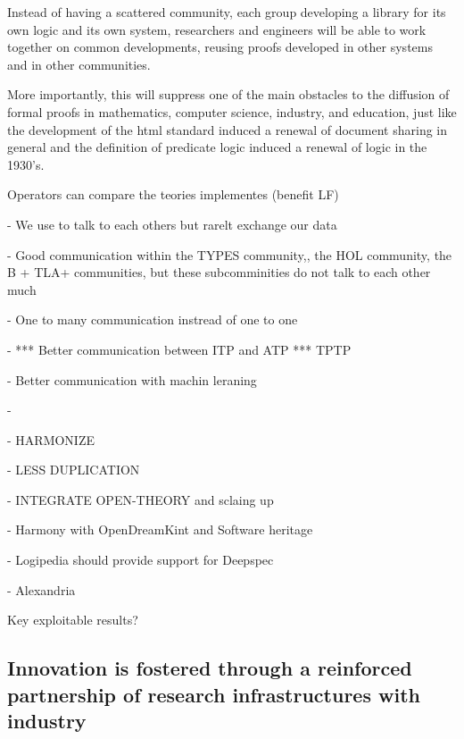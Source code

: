 Instead of having a scattered community, each group developing a
library for its own logic and its own system, researchers and
engineers will be able to work together on common developments,
reusing proofs developed in other systems and in other communities.

More importantly, this will suppress one of the main obstacles to the
diffusion of formal proofs in mathematics, computer science, industry,
and education, just like the development of the html standard induced
a renewal of document sharing in general and the definition of
predicate logic induced a renewal of logic in the 1930's.

Operators can compare the teories implementes (benefit LF)

- We use to talk to each others but rarelt exchange our data

- Good communication within the TYPES community,, the HOL community,
the B + TLA+ communities, but these subcomminities do not talk to each
other much

- One to many communication instread of one to one

- *** Better communication between ITP and ATP *** TPTP

- Better communication with machin leraning





- 

- HARMONIZE

- LESS DUPLICATION

- INTEGRATE OPEN-THEORY and sclaing up

- Harmony with OpenDreamKint and Software heritage

- Logipedia should provide support for Deepspec

- Alexandria

{\color{red} Key exploitable results?}





\subsection{Innovation is fostered through a reinforced partnership of research
infrastructures with industry}

